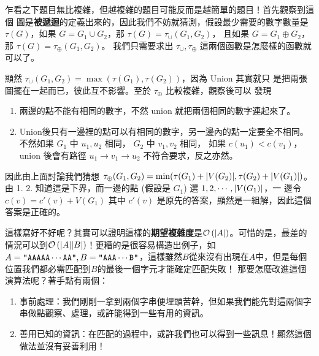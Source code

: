 \documentclass[a4paper,12pt]{book}
\begin{document}

乍看之下題目無比複雜，但越複雜的題目可能反而是越簡單的題目！首先觀察到這個
圖是{\bf 被遞迴}的定義出來的，因此我們不妨就猜測，假設最少需要的數字數量是
$\tau(G)$，如果 $G = G_1 \cup G_2$，那 $\tau(G) = \tau_\cup(G_1, G_2)$，
且如果 $G = G_1 \oplus G_2$，那 $\tau(G) = \tau_\oplus(G_1, G_2)$。
我們只需要求出 $\tau_\cup, \tau_\oplus$ 這兩個函數是怎麼樣的函數就可以了。

顯然 $\tau_\cup(G_1, G_2) = \max(\tau(G_1), \tau(G_2))$，因為 Union 其實就只
是把兩張圖擺在一起而已，彼此互不影響。至於 $\tau_\oplus$ 比較複雜，觀察後可以
發現
\begin{enumerate}
  \item  兩邊的點不能有相同的數字，不然 union 就把兩個相同的數字連起來了。
  \item  Union後只有一邊裡的點可以有相同的數字，另一邊內的點一定要全不相同。
          不然如果 $G_1$ 中 $u_1, u_2$ 相同， $G_2$ 中 $v_1, v_2$ 相同，
          如果 $c(u_1) < c(v_1)$，union 後會有路徑
        $u_1 \to v_1 \to u_2$ 不符合要求，反之亦然。
\end{enumerate}
因此由上面討論我們猜想 $\tau_\oplus(G_1, G_2) = \min(\tau(G_1)+\lvert V(G_2) \rvert, 
\tau(G_2)+\lvert V(G_1) \rvert)$。
由 1. 2. 知道這是下界，而一邊的點 (假設是 $G_1$) 選 $1, 2, \cdots, \lvert V(G_1) \rvert$，一
邊令 $c(v) = c'(v) + V(G_1)$ 其中 $c'(v)$ 是原先的答案，顯然是一組解，因此這個答案是正確的。

這樣寫好不好呢？其實可以證明這樣的{\bf 期望複雜度}是$\operatorname{\mathcal{O}}\left(\lvert A \rvert\right)$。可惜的是，最差的情況可以到$\operatorname{\mathcal{O}}\left(\lvert A \rvert\lvert B \rvert\right)$！更糟的是很容易構造出例子，如$A = \texttt{"AAAAA}\cdots\texttt{AA"}, B = \texttt{"AAA}\cdots\texttt{B"}$，這樣雖然$B$從來沒有出現在$A$中，但是每個位置我們都必需匹配到$B$的最後一個字元才能確定匹配失敗！
那要怎麼改進這個演算法呢？著手點有兩個：
\begin{enumerate}
  \item 事前處理：我們剛剛一拿到兩個字串便埋頭苦幹，但如果我們能先對這兩個字串做點觀察、處理，或許能得到一些有用的資訊。
  \item 善用已知的資訊：在匹配的過程中，或許我們也可以得到一些訊息！顯然這個做法並沒有妥善利用！
\end{enumerate}
\end{document}
